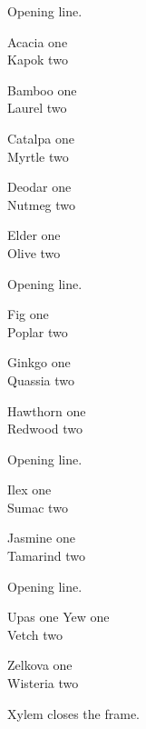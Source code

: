 \documentclass[10pt]{beamer}
\begin{document}
\begin{frame}[t]
Opening line.

{\tiny Acacia one\\Kapok two\par}

{\scriptsize Bamboo one\\Laurel two\par}

{\footnotesize Catalpa one\\Myrtle two\par}

{\small Deodar one\\Nutmeg two\par}

{\normalsize Elder one\\Olive two\par}
\end{frame}
\begin{frame}[t]
Opening line.

{\large Fig one\\Poplar two\par}

{\Large Ginkgo one\\Quassia two\par}

{\LARGE Hawthorn one\\Redwood two\par}
\end{frame}
\begin{frame}[t]
Opening line.

{\huge Ilex one\\Sumac two\par}

{\Huge Jasmine one\\Tamarind two\par}
\end{frame}
\begin{frame}[t]
Opening line.

Upas one {\small Yew} one\\Vetch two\par

{\small Zelkova one\\Wisteria two}\par

Xylem closes the frame.
\end{frame}
\end{document}
